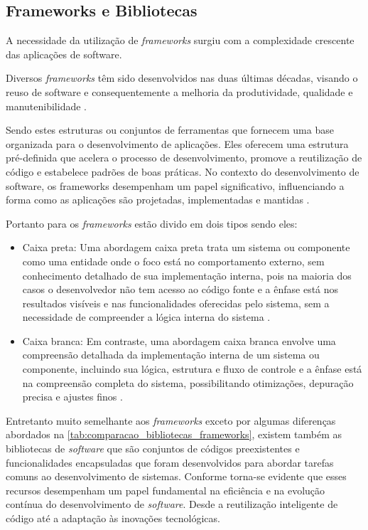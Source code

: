 \subsection{Frameworks e Bibliotecas}
A necessidade da utilização de \textit{frameworks} surgiu com a complexidade crescente das aplicações de software.
\begin{citacao}
	Diversos \textit{frameworks} têm sido desenvolvidos nas duas últimas décadas, visando o
	reuso de software e consequentemente a melhoria da produtividade, qualidade e
	manutenibilidade \cite{maldonado2002padroes}.
\end{citacao}
Sendo estes estruturas ou conjuntos de ferramentas que fornecem uma base organizada para o desenvolvimento de aplicações. Eles oferecem uma estrutura pré-definida que acelera o processo de desenvolvimento, promove a reutilização de código e estabelece padrões de boas práticas. No contexto do desenvolvimento de software, os frameworks desempenham um papel significativo, influenciando a forma como as aplicações são projetadas, implementadas e mantidas \cite{maldonado2002padroes}.

Portanto para  os \textit{frameworks} estão divido em dois tipos sendo eles:
\begin{itemize}
    \item Caixa preta: Uma abordagem caixa preta trata um sistema ou componente como uma entidade onde o foco está no comportamento externo, sem conhecimento detalhado de sua implementação interna, pois na maioria dos casos o desenvolvedor não tem acesso ao código fonte e a ênfase está nos resultados visíveis e nas funcionalidades oferecidas pelo sistema, sem a necessidade de compreender a lógica interna do sistema \cite[p.~23]{maldonado2002padroes}.
    \item Caixa branca: Em contraste, uma abordagem caixa branca envolve uma compreensão detalhada da implementação interna de um sistema ou componente, incluindo sua lógica, estrutura e fluxo de controle e a ênfase está na compreensão completa do sistema, possibilitando otimizações, depuração precisa e ajustes finos \cite[p.~23]{maldonado2002padroes}.
\end{itemize}

Entretanto muito semelhante aos \textit{frameworks} exceto por algumas diferenças abordados na \autoref{tab:comparacao_bibliotecas_frameworks}, existem também as bibliotecas de \textit{software} que são conjuntos de códigos preexistentes e funcionalidades encapsuladas que foram desenvolvidos para abordar tarefas comuns ao desenvolvimento de sistemas. 
Conforme  torna-se evidente que esses recursos desempenham um papel fundamental na eficiência e na evolução contínua do desenvolvimento de \textit{software}. Desde a reutilização inteligente de código até a adaptação às inovações tecnológicas.


